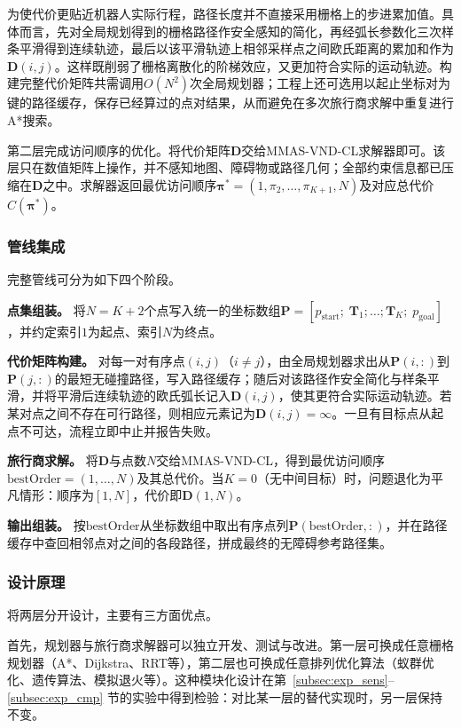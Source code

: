\documentclass[lettersize,journal]{IEEEtran}
\begin{document}
为使代价更贴近机器人实际行程，路径长度并不直接采用栅格上的步进累加值。具体而言，先对全局规划得到的栅格路径作安全感知的简化，再经弧长参数化三次样条平滑得到连续轨迹，最后以该平滑轨迹上相邻采样点之间欧氏距离的累加和作为$\mathbf{D}(i, j)$。这样既削弱了栅格离散化的阶梯效应，又更加符合实际的运动轨迹。构建完整代价矩阵共需调用$O(N^2)$次全局规划器；工程上还可选用以起止坐标对为键的路径缓存，保存已经算过的点对结果，从而避免在多次旅行商求解中重复进行A*搜索。

第二层完成访问顺序的优化。将代价矩阵$\mathbf{D}$交给MMAS-VND-CL求解器即可。该层只在数值矩阵上操作，并不感知地图、障碍物或路径几何；全部约束信息都已压缩在$\mathbf{D}$之中。求解器返回最优访问顺序$\bm{\pi}^{*} = (1, \pi_2, \dots, \pi_{K+1}, N)$及对应总代价$C(\bm{\pi}^{*})$。
\subsubsection{管线集成}
完整管线可分为如下四个阶段。

\textbf{点集组装。} 将$N = K + 2$个点写入统一的坐标数组$\mathbf{P} = [p_{\mathrm{start}};\; \mathbf{T}_1; \dots; \mathbf{T}_K;\; p_{\mathrm{goal}}]$，并约定索引$1$为起点、索引$N$为终点。

\textbf{代价矩阵构建。} 对每一对有序点$(i, j)$（$i \neq j$），由全局规划器求出从$\mathbf{P}(i,:)$到$\mathbf{P}(j,:)$的最短无碰撞路径，写入路径缓存；随后对该路径作安全简化与样条平滑，并将平滑后连续轨迹的欧氏弧长记入$\mathbf{D}(i, j)$，使其更符合实际运动轨迹。若某对点之间不存在可行路径，则相应元素记为$\mathbf{D}(i, j) = \infty$。一旦有目标点从起点不可达，流程立即中止并报告失败。

\textbf{旅行商求解。} 将$\mathbf{D}$与点数$N$交给MMAS-VND-CL，得到最优访问顺序$\mathrm{bestOrder} = (1, \dots, N)$及其总代价。当$K = 0$（无中间目标）时，问题退化为平凡情形：顺序为$[1, N]$，代价即$\mathbf{D}(1, N)$。

\textbf{输出组装。} 按$\mathrm{bestOrder}$从坐标数组中取出有序点列$\mathbf{P}(\mathrm{bestOrder}, :)$，并在路径缓存中查回相邻点对之间的各段路径，拼成最终的无障碍参考路径集。
\subsubsection{设计原理}
将两层分开设计，主要有三方面优点。

首先，规划器与旅行商求解器可以独立开发、测试与改进。第一层可换成任意栅格规划器（A*、Dijkstra、RRT等），第二层也可换成任意排列优化算法（蚁群优化、遗传算法、模拟退火等）。这种模块化设计在第~\textcolor{blue}{\ref{subsec:exp_sens}}--\textcolor{blue}{\ref{subsec:exp_cmp}} 节的实验中得到检验：对比某一层的替代实现时，另一层保持不变。
\end{document}
